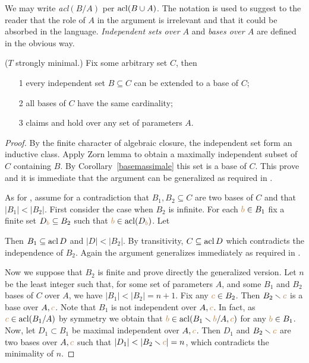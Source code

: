 We may write \emph{acl$(B/A)$\/} per $\mathop{\rm acl}(B\cup A)$.
The notation is used to suggest to the reader that the role of $A$ in the argument is irrelevant and that it could be absorbed in the language.
\emph{Independent sets over $A$\/} and \emph{bases over $A$\/} are defined in the obvious way.

\begin{theorem} ($T$ strongly minimal.) Fix some arbitrary set $C$, then
\begin{itemize}
\item[1] every independent set $B\subseteq C$ can be extended to a base of $C$;
\item[2] all bases of $C$ have the same cardinality;
\item[3] claims  and  hold over any set of parameters $A$.
\end{itemize}
\end{theorem}

\begin{proof}
By the finite character of algebraic closure, the independent set form an inductive class.
Apply Zorn lemma to obtain a maximally independent subset of $C$ containing $B$.
By Corollary~\ref{basemassimale} this set is a base of $C$.
This prove  and it is immediate that the argument can be generalized as required in .

As for , assume for a contradiction that $B_1,B_2\subseteq C$ are two bases of $C$ and that $|B_1|<|B_2|$.
First consider the case when $B_2$ is infinite.
For each ${\color{brown} b}\in B_1$ fix a finite set $D_{\color{brown} b}\subseteq B_2$ such that ${\color{brown} b}\in\mathop{\rm acl}(D_{\color{brown} b})$.
Let


Then $B_1\subseteq\mathop{\rm acl} D$ and $|D|<|B_2|$.
By transitivity, $C\subseteq\mathop{\rm acl} D$ which contradicts the independence of $B_2$.
Again the argument generalizes immediately as required in .

Now we suppose that $B_2$ is finite and prove directly the generalized version.
Let $n$ be the least integer such that, for some set of parameters $A$, and some $B_1$ and $B_2$ bases of $C$ over $A$, we have $|B_1|<|B_2|=n+1$.
Fix any ${\color{brown} c}\in B_2$.
Then $B_2\smallsetminus{\color{brown}c}$ is a base over $A,{\color{brown} c}$.
Note that $B_1$ is not independent over $A,{\color{brown} c}$.
In fact, as ${\color{brown} c}\in\mathop{\rm acl}(B_1/A)$ by symmetry we obtain that ${\color{brown} b}\in\mathop{\rm acl}(B_1\smallsetminus{\color{brown}b}/A,{\color{brown} c})$ for any ${\color{brown} b}\in B_1$.
Now, let $D_1\subset B_1$ be maximal independent over $A,{\color{brown} c}$.
Then $D_1$ and $B_2\smallsetminus{\color{brown}c}$ are two bases over $A,{\color{brown} c}$ such that $|D_1|<|B_2\sm{\mr c}|=n$, which contradicts the minimality of $n$.
\end{proof}

